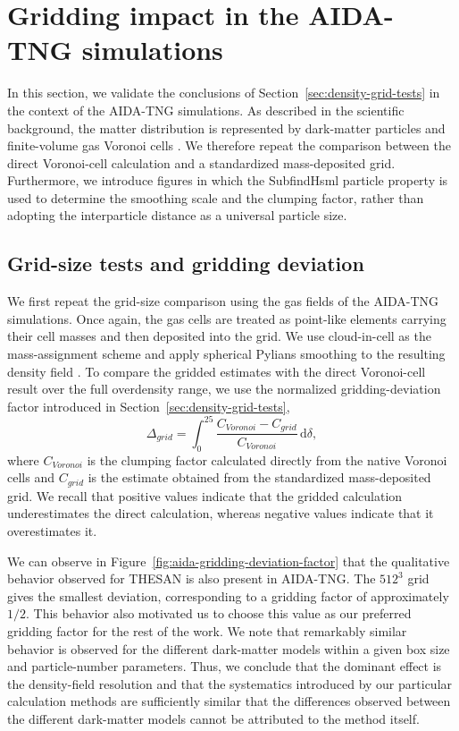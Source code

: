 \documentclass[%
 reprint,
nofootinbib,
 amsmath,amssymb,
 aps,
]{revtex4-2}
\begin{document}
\newpage
\appendix
\section{Gridding impact in the AIDA-TNG simulations}

\label{apx:AIDA-TNG}

In this section, we validate the conclusions of Section~\ref{sec:density-grid-tests} in the context of the AIDA-TNG simulations. As described in the scientific background, the matter distribution is represented by dark-matter particles and finite-volume gas Voronoi cells \cite{springel2010arepo,despali2025aidatng}. We therefore repeat the comparison between the direct Voronoi-cell calculation and a standardized mass-deposited grid. Furthermore, we introduce figures in which the SubfindHsml particle property is used to determine the smoothing scale and the clumping factor, rather than adopting the interparticle distance as a universal particle size.

\subsection{Grid-size tests and gridding deviation}

We first repeat the grid-size comparison using the gas fields of the AIDA-TNG simulations. Once again, the gas cells are treated as point-like elements carrying their cell masses and then deposited into the grid. We use cloud-in-cell as the mass-assignment scheme and apply spherical Pylians smoothing to the resulting density field \cite{jing2005correcting,pylians2018}. To compare the gridded estimates with the direct Voronoi-cell result over the full overdensity range, we use the normalized gridding-deviation factor introduced in Section~\ref{sec:density-grid-tests},
\begin{equation}
    \Delta_{grid} = \int_{0}^{25}
    \frac{C_{Voronoi} - C_{grid}}
    {C_{Voronoi}}\,\mathrm{d}\delta,
    \label{eq:aida-gridding-deviation}
\end{equation}
where $C_{Voronoi}$ is the clumping factor calculated directly from the native Voronoi cells and $C_{grid}$ is the estimate obtained from the standardized mass-deposited grid. We recall that positive values indicate that the gridded calculation underestimates the direct calculation, whereas negative values indicate that it overestimates it.

We can observe in Figure~\ref{fig:aida-gridding-deviation-factor} that the qualitative behavior observed for THESAN is also present in AIDA-TNG. The $512^3$ grid gives the smallest deviation, corresponding to a gridding factor of approximately $1/2$. This behavior also motivated us to choose this value as our preferred gridding factor for the rest of the work. We note that remarkably similar behavior is observed for the different dark-matter models within a given box size and particle-number parameters. Thus, we conclude that the dominant effect is the density-field resolution and that the systematics introduced by our particular calculation methods are sufficiently similar that the differences observed between the different dark-matter models cannot be attributed to the method itself.
\end{document}
